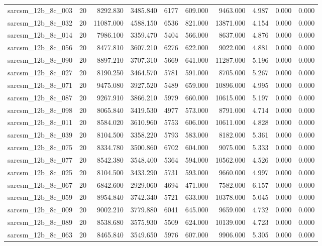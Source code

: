 \begin{tabular}{lrrrrrrrrr}
sarcsm\_12b\_8c\_003 & 20 & 8292.830 & 3485.840 & 6177 & 609.000 & 9463.000 & 4.987 & 0.000 & 0.000 \\
sarcsm\_12b\_8c\_032 & 20 & 11087.000 & 4588.150 & 6536 & 821.000 & 13871.000 & 4.154 & 0.000 & 0.000 \\
sarcsm\_12b\_8c\_014 & 20 & 7986.100 & 3359.470 & 5404 & 566.000 & 8637.000 & 4.876 & 0.000 & 0.000 \\
sarcsm\_12b\_8c\_056 & 20 & 8477.810 & 3607.210 & 6276 & 622.000 & 9022.000 & 4.881 & 0.000 & 0.000 \\
sarcsm\_12b\_8c\_090 & 20 & 8897.210 & 3707.310 & 5669 & 641.000 & 11287.000 & 5.196 & 0.000 & 0.000 \\
sarcsm\_12b\_8c\_027 & 20 & 8190.250 & 3464.570 & 5781 & 591.000 & 8705.000 & 5.267 & 0.000 & 0.000 \\
sarcsm\_12b\_8c\_071 & 20 & 9475.080 & 3927.520 & 5489 & 659.000 & 10896.000 & 4.995 & 0.000 & 0.000 \\
sarcsm\_12b\_8c\_087 & 20 & 9267.910 & 3866.210 & 5979 & 660.000 & 10615.000 & 5.197 & 0.000 & 0.000 \\
sarcsm\_12b\_8c\_098 & 20 & 8065.840 & 3419.530 & 4977 & 573.000 & 8791.000 & 4.714 & 0.000 & 0.000 \\
sarcsm\_12b\_8c\_011 & 20 & 8584.020 & 3610.960 & 5753 & 606.000 & 10611.000 & 4.828 & 0.000 & 0.000 \\
sarcsm\_12b\_8c\_039 & 20 & 8104.500 & 3358.220 & 5793 & 583.000 & 8182.000 & 5.361 & 0.000 & 0.000 \\
sarcsm\_12b\_8c\_075 & 20 & 8334.780 & 3500.860 & 6702 & 604.000 & 9075.000 & 5.333 & 0.000 & 0.000 \\
sarcsm\_12b\_8c\_077 & 20 & 8542.380 & 3548.400 & 5364 & 594.000 & 10562.000 & 4.526 & 0.000 & 0.000 \\
sarcsm\_12b\_8c\_025 & 20 & 8104.500 & 3433.290 & 5731 & 593.000 & 9660.000 & 4.997 & 0.000 & 0.000 \\
sarcsm\_12b\_8c\_067 & 20 & 6842.600 & 2929.060 & 4694 & 471.000 & 7582.000 & 6.157 & 0.000 & 0.000 \\
sarcsm\_12b\_8c\_059 & 20 & 8954.840 & 3742.340 & 5721 & 633.000 & 10378.000 & 5.045 & 0.000 & 0.000 \\
sarcsm\_12b\_8c\_009 & 20 & 9002.210 & 3779.880 & 6041 & 645.000 & 9659.000 & 4.732 & 0.000 & 0.000 \\
sarcsm\_12b\_8c\_089 & 20 & 8538.680 & 3575.930 & 5509 & 624.000 & 10139.000 & 4.723 & 0.000 & 0.000 \\
sarcsm\_12b\_8c\_063 & 20 & 8465.840 & 3549.650 & 5976 & 607.000 & 9906.000 & 5.305 & 0.000 & 0.000 \\

\end{tabular}
